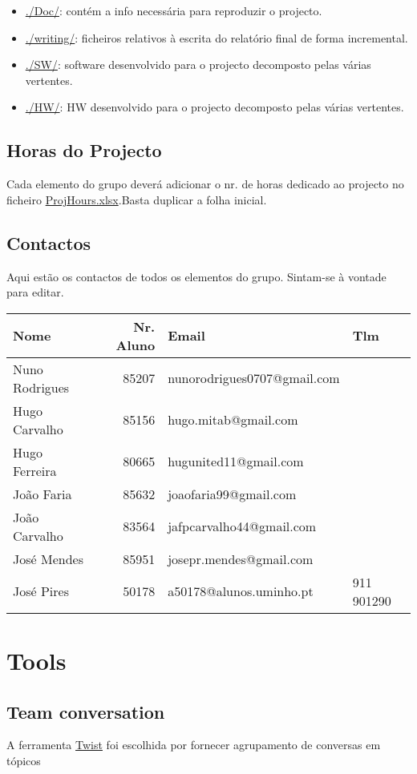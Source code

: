 \documentclass[11pt]{article}
\begin{document}
\begin{itemize}
\begin{itemize}
\begin{itemize}
{de carga num tapete rolante}
\end{itemize}
\end{itemize}
\item \href{Doc}{./Doc/}: contém a info necessária para reproduzir o projecto.
\item \href{readme.org}{./writing/}: ficheiros relativos à escrita do relatório final de forma
incremental.
\item \href{SW}{./SW/}: software desenvolvido para o projecto decomposto pelas várias
vertentes.
\item \href{HW}{./HW/}: HW desenvolvido para o projecto decomposto pelas várias vertentes.
\end{itemize}
\subsection{Horas do Projecto}
\label{sec:org6fc3a8d}
Cada elemento do grupo deverá adicionar o nr. de horas dedicado ao projecto
no ficheiro \href{ProjManag/ProjHours.xlsx}{ProjHours.xlsx}.Basta duplicar a folha inicial.
\subsection{Contactos}
\label{sec:org35be522}
Aqui estão os contactos de todos os elementos do grupo. Sintam-se à vontade para editar.
\begin{center}
\begin{tabular}{lrll}
Nome & Nr. Aluno & Email & Tlm\\
\hline
Nuno Rodrigues & 85207 & nunorodrigues0707@gmail.com & \\
Hugo Carvalho & 85156 & hugo.mitab@gmail.com & \\
Hugo Ferreira & 80665 & hugunited11@gmail.com & \\
João Faria & 85632 & joaofaria99@gmail.com & \\
João Carvalho & 83564 & jafpcarvalho44@gmail.com & \\
José Mendes & 85951 & josepr.mendes@gmail.com & \\
José Pires & 50178 & a50178@alunos.uminho.pt & 911 901290\\
\end{tabular}
\end{center}

\section{Tools}
\label{sec:org43134b7}
\subsection{Team conversation}
\label{sec:org10b807a}
A ferramenta \href{https://twist.com}{Twist} foi escolhida por fornecer agrupamento de conversas em
tópicos
\end{document}
